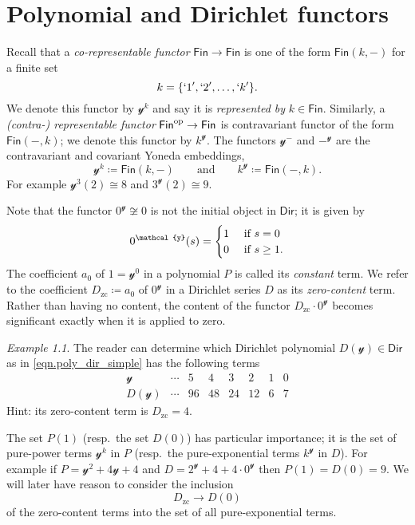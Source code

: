 \documentclass[11pt, article, one side]{memoir}
\theoremstyle{theorem}
\theoremstyle{definition}
\theoremstyle{remark}
\newtheorem{example}[section]{Example}
\newcommand{\Cat}[1]{\mathsf{#1}}%
\newcommand{\op}{^\tn{op}}
\newcommand{\tn}[1]{\textnormal{#1}}
\newcommand{\fin}{\Cat{Fin}}
\newcommand{\zero}[1]{#1_\text{zc}}
\newcommand{\yon}{\mathcal{y}}
\newcommand{\dir}{\Cat{Dir}}
\newcommand{\mdot}{{\cdot}}
\newcommand{\qqand}{\qquad\text{and}\qquad}
\begin{document}
\chapter{Polynomial and Dirichlet functors}

Recall that a \emph{co-representable functor} $\fin\to\fin$ is one of the form $\fin(k, -)$ for a finite set
\[k=\{`1', `2',\ldots,`k'\}.\]
We denote this functor by $\yon^k$ and say it is \emph{represented by} $k\in\fin$. Similarly, a \emph{(contra-) representable functor} $\fin\op\to\fin$ is contravariant functor of the form $\fin(-,k)$; we denote this functor by $k^\yon$. The functors $\yon^-$ and $-^\yon$ are the contravariant and covariant Yoneda embeddings,
\[
  \yon^k \coloneqq \fin(k,-)
  \qqand
  k^\yon\coloneqq\fin(-,k).
\]
For example $\yon^3(2)\cong8$ and $3^\yon(2)\cong9$.

Note that the functor $0^\yon\not\cong 0$ is not the initial object in $\dir$; it is given by
\[
0^\yon(s)=
\begin{cases}
1&\tn{ if } s=0\\
0&\tn{ if } s\geq1.
\end{cases}
\]
The coefficient $a_0$ of $1=\yon^0$ in a polynomial $P$ is called its \emph{constant} term. We refer to the coefficient $\zero{D}\coloneqq a_0$ of $0^\yon$ in a Dirichlet series $D$ as its \emph{zero-content} term. Rather than having no content, the content of the functor $\zero{D}\mdot0^\yon$ becomes significant exactly when it is applied to zero.

\begin{example}
The reader can determine which Dirichlet polynomial $D(\yon)\in\dir$ as in \cref{eqn.poly_dir_simple} has the following terms
\[
\begin{array}{c|ccccccc}
\yon&
\cdots&
5&
4&
3&
2&
1&
0
\\\hline
D(\yon)&
\cdots&
96&
48&
24&
12&
6&
7
\end{array}
\]
Hint: its zero-content term is $\zero{D}=4$.
\end{example}

The set $P(1)$ (resp.\ the set $D(0)$) has particular importance; it is the set of pure-power terms $\yon^k$ in $P$ (resp.\ the pure-exponential terms $k^\yon$ in $D$). For example if $P=\yon^2+4\yon+4$ and $D=2^\yon+4+4\mdot0^\yon$ then $P(1)=D(0)=9$. We will later have reason to consider the inclusion
\begin{equation}\label{eqn.zerocontent}
\zero{D}\to D(0)
\end{equation}
of the zero-content terms into the set of all pure-exponential terms.
\end{document}
